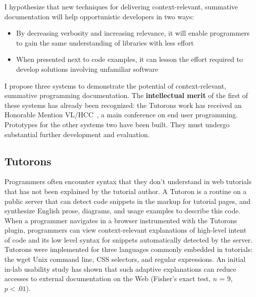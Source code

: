 \documentclass[12pt]{memoir}
\begin{document}
I hypothesize that new techniques for delivering context-relevant, summative documentation will help opportunistic developers in two ways:
\begin{itemize}[noitemsep,topsep=0pt]
\item By decreasing verbosity and increasing relevance, it will enable programmers to gain the same understanding of libraries with less effort
\item When presented next to code examples, it can lesson the effort required to develop solutions involving unfamiliar software
\end{itemize}

I propose three systems to demonstrate the potential of context-relevant, summative programming documentation.
The \textbf{intellectual merit} of the first of these systems has already been recognized:
the Tutorons work has received an Honorable Mention VL/HCC~\cite{head_tutorons_2015}, a main conference on end user programming.
Prototypes for the other systems two have been built.
They must undergo substantial further development and evaluation.

\subsection{Tutorons}
Programmers often encounter syntax that they don't understand in web tutorials that has not been explained by the tutorial author.
A Tutoron is a routine on a public server that can detect code snippets in the markup for tutorial pages, and synthesize English prose, diagrams, and usage examples to describe this code.
When a programmer navigates in a browser instrumented with the Tutorons plugin, programmers can view context-relevant explanations of high-level intent of code and its low level syntax for snippets automatically detected by the server.
Tutorons were implemented for three languages commonly embedded in tutorials: the wget Unix command line, CSS selectors, and regular expressions.
An initial in-lab usability study has shown that such adaptive explanations can reduce accesses to external documentation on the Web (Fisher's exact test, $n$ = 9, $p<.01$).
\end{document}
